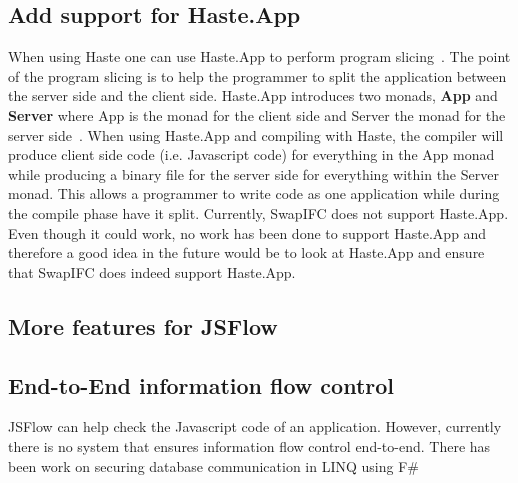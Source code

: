\subsection{Add support for Haste.App}
When using Haste one can use Haste.App to perform program slicing~\cite{haste-symposium}. The point of the program slicing is to help the programmer to split the application between the server side and the client side. Haste.App introduces two monads, \textbf{App} and \textbf{Server} where App is the monad for the client side and Server the monad for the server side~\cite{haste-app}. When using Haste.App and compiling with Haste, the compiler will produce client side code (i.e. Javascript code) for everything in the App monad while producing a binary file for the server side for everything within the Server monad. This allows a programmer to write code as one application while during the compile phase have it split. Currently, SwapIFC does not support Haste.App. Even though it could work, no work has been done to support Haste.App and therefore a good idea in the future would be to look at Haste.App and ensure that SwapIFC does indeed support Haste.App.

\subsection{More features for JSFlow}

\subsection{End-to-End information flow control}
JSFlow can help check the Javascript code of an application. However, currently there is no system that ensures information flow control end-to-end. There has been work on securing database communication in LINQ using F\#~\cite{selinq}
